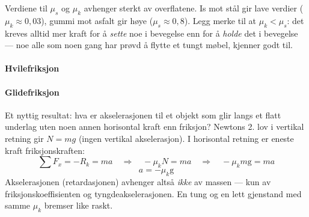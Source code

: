 Verdiene til $\mu_s$ og $\mu_k$ avhenger sterkt av overflatene. Is mot stål gir lave verdier ($\mu_k \approx 0{,}03$), gummi mot asfalt gir høye ($\mu_s \approx 0{,}8$). Legg merke til at $\mu_k < \mu_s$: det kreves alltid mer kraft for å \textit{sette} noe i bevegelse enn for å \textit{holde} det i bevegelse — noe alle som noen gang har prøvd å flytte et tungt møbel, kjenner godt til.

\paragraph*{Hvilefriksjon}




\paragraph*{Glidefriksjon}

Et nyttig resultat: hva er akselerasjonen til et objekt som glir langs et flatt underlag uten noen annen horisontal kraft enn friksjon? Newtons 2. lov i vertikal retning gir $N = mg$ (ingen vertikal akselerasjon). I horisontal retning er eneste kraft friksjonskraften:
\[
    \sum F_x = -R_k = ma
    \quad\Rightarrow\quad
    -\mu_k N = ma
    \quad\Rightarrow\quad
    -\mu_k m\mathrm{g} = ma
\]
\[
    \boxed{a = -\mu_k \mathrm{g}}
\]
Akselerasjonen (retardasjonen) avhenger altså \textit{ikke} av massen — kun av friksjonskoeffisienten og tyngdeakselerasjonen. En tung og en lett gjenstand med samme $\mu_k$ bremser like raskt.

